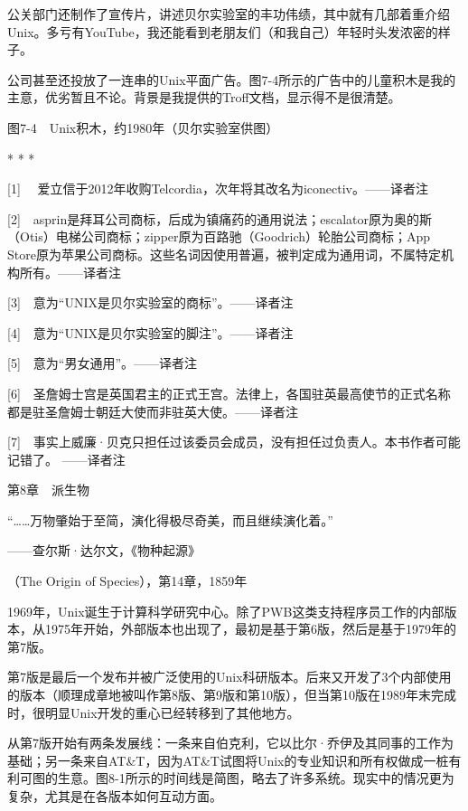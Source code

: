 \documentclass[a4paper,12pt,UTF8,twoside]{ctexbook}
\begin{document}
公关部门还制作了宣传片，讲述贝尔实验室的丰功伟绩，其中就有几部着重介绍Unix。多亏有YouTube，我还能看到老朋友们（和我自己）年轻时头发浓密的样子。

公司甚至还投放了一连串的Unix平面广告。图7-4所示的广告中的儿童积木是我的主意，优劣暂且不论。背景是我提供的Troff文档，显示得不是很清楚。



图7-4　Unix积木，约1980年（贝尔实验室供图）



* * *



[1]　 爱立信于2012年收购Telcordia，次年将其改名为iconectiv。——译者注

[2]　asprin是拜耳公司商标，后成为镇痛药的通用说法；escalator原为奥的斯（Otis）电梯公司商标；zipper原为百路驰（Goodrich）轮胎公司商标；App Store原为苹果公司商标。这些名词因使用普遍，被判定成为通用词，不属特定机构所有。——译者注

[3]　意为“UNIX是贝尔实验室的商标”。——译者注

[4]　意为“UNIX是贝尔实验室的脚注”。——译者注

[5]　意为“男女通用”。——译者注

[6]　圣詹姆士宫是英国君主的正式王宫。法律上，各国驻英最高使节的正式名称都是驻圣詹姆士朝廷大使而非驻英大使。——译者注

[7]　事实上威廉·贝克只担任过该委员会成员，没有担任过负责人。本书作者可能记错了。 ——译者注





第8章　派生物


“……万物肇始于至简，演化得极尽奇美，而且继续演化着。”

——查尔斯·达尔文，《物种起源》

（The Origin of Species），第14章，1859年

1969年，Unix诞生于计算科学研究中心。除了PWB这类支持程序员工作的内部版本，从1975年开始，外部版本也出现了，最初是基于第6版，然后是基于1979年的第7版。

第7版是最后一个发布并被广泛使用的Unix科研版本。后来又开发了3个内部使用的版本（顺理成章地被叫作第8版、第9版和第10版），但当第10版在1989年末完成时，很明显Unix开发的重心已经转移到了其他地方。

从第7版开始有两条发展线：一条来自伯克利，它以比尔·乔伊及其同事的工作为基础；另一条来自AT\&T，因为AT\&T试图将Unix的专业知识和所有权做成一桩有利可图的生意。图8-1所示的时间线是简图，略去了许多系统。现实中的情况更为复杂，尤其是在各版本如何互动方面。
\end{document}
